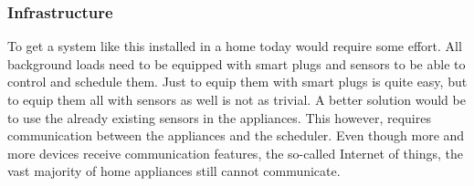 \subsubsection{Infrastructure}
To get a system like this installed in a home today would require some effort. All background loads need to be equipped with smart plugs and sensors to be able to control and schedule them. Just to equip them with smart plugs is quite easy, but to equip them all with sensors as well is not as trivial. A better solution would be to use the already existing sensors in the appliances. This however, requires communication between the appliances and the scheduler. Even though more and more devices receive communication features, the so-called Internet of things, the vast majority of home appliances still cannot communicate.